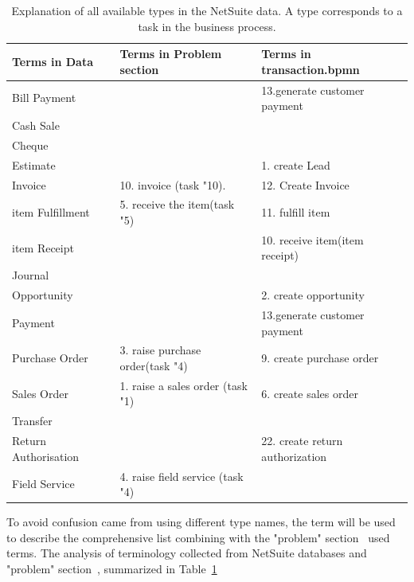 

\begin{table}[htb]
\footnotesize	 %
\begin{tabularx}{\textwidth}{X|X|X}
\hline
\textbf{Terms in Data} & \textbf{Terms in Problem section} & \textbf{Terms in transaction.bpmn} \\

\hline
Bill Payment &  & 13.generate customer payment\\
\hline
Cash Sale  &  & \\
\hline
Cheque  &  & \\
\hline
Estimate  &  &1. create Lead \\
\hline
Invoice  & 10. invoice (task "10). & 12. Create Invoice \\
\hline
item Fulfillment  & 5. receive the item(task "5) & 11. fulfill item \\
\hline
item Receipt  &  & 10. receive item(item receipt)\\
\hline
Journal  &  \\
\hline
Opportunity  &  & 2. create opportunity\\
\hline
Payment  &  & 13.generate customer payment\\
\hline
Purchase Order  & 3. raise purchase order(task "4) & 9. create purchase order  \\
\hline
Sales Order  & 1. raise a sales order (task "1) & 6. create sales order\\
\hline
Transfer  &  \\
\hline
Return Authorisation  & & 22. create return authorization \\
\hline
Field Service  & 4. raise field service (task "4)   \\
\hline
\end{tabularx}
\caption{Explanation of all available types in the NetSuite data. A type corresponds to a task in the business process.}
\label{table:terminologyData}
\end{table}

To avoid confusion came from using different type names, the term will be used to describe the comprehensive list combining with the "problem" section~\pageref{figure:soAndfieldservice} used terms. The analysis of terminology collected from NetSuite databases and "problem" section~\pageref{figure:soAndfieldservice}, summarized in Table~\ref{table:terminologyData}

